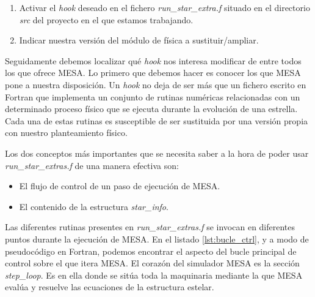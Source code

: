 \begin{enumerate}
    \item Activar el \textit{hook} deseado en el fichero \textit{run\_star\_extra.f} situado en el directorio \textit{src} del proyecto en el que estamos trabajando.
    \item Indicar nuestra versión del módulo de física a sustituir/ampliar.
\end{enumerate}

Seguidamente debemos localizar qué \textit{hook} nos interesa modificar de entre todos los que ofrece MESA. Lo primero que debemos hacer es conocer los que MESA pone a nuestra disposición. Un \textit{hook} no deja de ser más que un fichero escrito en Fortran que implementa un conjunto de rutinas numéricas relacionadas con un determinado proceso físico que se ejecuta durante la evolución de una estrella. Cada una de estas rutinas es susceptible de ser sustituida por una versión propia con nuestro planteamiento físico.\par

Los dos conceptos más importantes que se necesita saber a la hora de poder usar \textit{run\_star\_extras.f} de una manera efectiva son:
\begin{itemize}
    \item El flujo de control de un paso de ejecución de MESA.
    \item El contenido de la estructura \textit{star\_info}.
\end{itemize}

Las diferentes rutinas presentes en \textit{run\_star\_extras.f} se invocan en diferentes puntos durante la ejecución de MESA. En el listado \ref{lst:bucle_ctrl}, y a modo de pseudo\-código en Fortran, podemos encontrar el aspecto del bucle principal de control sobre el que itera MESA. El corazón del simulador MESA es la sección \textit{step\_loop}. Es en ella donde se sitúa toda la maquinaria mediante la que MESA evalúa y resuelve las ecuaciones de la estructura estelar.\par

